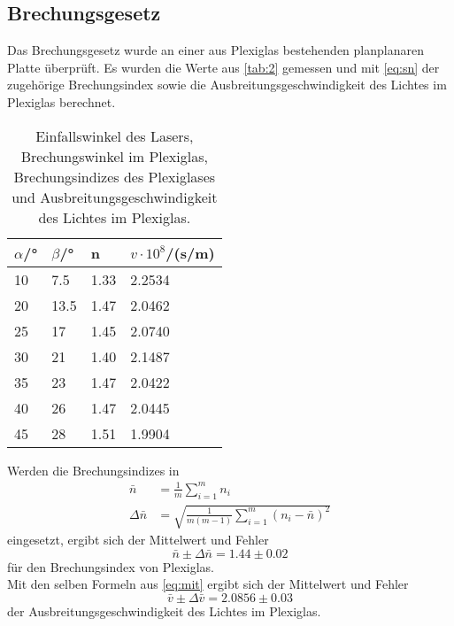 \subsection{Brechungsgesetz}
Das Brechungsgesetz wurde an einer aus Plexiglas bestehenden planplanaren Platte überprüft. Es wurden die Werte aus \autoref{tab:2} gemessen und mit \eqref{eq:sn} der zugehörige Brechungsindex sowie die Ausbreitungsgeschwindigkeit des Lichtes im Plexiglas berechnet.
\begin{table}[H]
  \centering
  \caption{Einfallswinkel des Lasers, Brechungswinkel im Plexiglas, Brechungsindizes des Plexiglases und Ausbreitungsgeschwindigkeit des Lichtes im Plexiglas.}
  \begin{tabular}{l|l|l|l}
  $\alpha$/° & $\beta$/° & n & $v\cdot 10^8$/(s/m)\\\hline
  10 & 7.5 & 1.33 & 2.2534\\
  20 & 13.5 & 1.47 & 2.0462\\
  25 & 17 & 1.45 & 2.0740\\
  30 & 21 & 1.40 & 2.1487\\
  35 & 23 & 1.47 & 2.0422\\
  40 & 26 & 1.47 & 2.0445\\
  45 & 28 & 1.51 & 1.9904\\\hline
  \end{tabular}
  \label{tab:2}
\end{table}
Werden die Brechungsindizes in 
\begin{align}
  \bar n&=\frac{1}{m}\sum\limits_{i=1}^m n_i \nonumber\\
  \Delta \bar n&=\sqrt{\frac{1}{m(m-1)}\sum\limits_{i=1}^m (n_i-\bar n)^2}
  \label{eq:mit}
\end{align}
eingesetzt, ergibt sich der Mittelwert und Fehler
\begin{equation*}
  \bar n \pm \Delta \bar n=1.44 \pm 0.02
\end{equation*}
für den Brechungsindex von Plexiglas.\\
Mit den selben Formeln aus \eqref{eq:mit} ergibt sich der Mittelwert und Fehler
\begin{equation*}
  \bar v \pm \Delta \bar v=2.0856 \pm 0.03
\end{equation*}
der Ausbreitungsgeschwindigkeit des Lichtes im Plexiglas.

